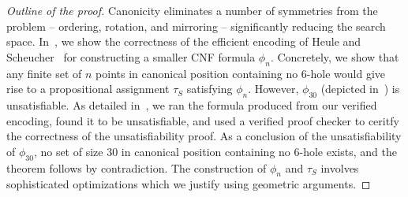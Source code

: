 \begin{proof}[Outline of the proof]
Canonicity eliminates a number of symmetries from the problem --
ordering, rotation, and mirroring --
significantly reducing the search space.
In~, we show the correctness of the efficient encoding of Heule and Scheucher~\cite{emptyHexagonNumber} for constructing
a smaller CNF formula $\phi_n$.
Concretely, we show that any finite set of $n$ points in canonical position
containing no $6$-hole
would give rise to a propositional assignment $\tau_S$ satisfying $\phi_n$.
However, $\phi_{30}$ (depicted in~) is unsatisfiable. As detailed in~, we ran the formula produced from our verified encoding, found it to be unsatisfiable, and used a verified proof checker to ceritfy the  correctness of the unsatisfiability proof.
As a conclusion of the unsatisfiability of $\phi_{30}$, no set of size $30$ in canonical position containing no $6$-hole exists,
and the theorem follows by contradiction.
The construction of $\phi_n$ and $\tau_S$
involves sophisticated optimizations
which we justify using geometric arguments.
\end{proof}



